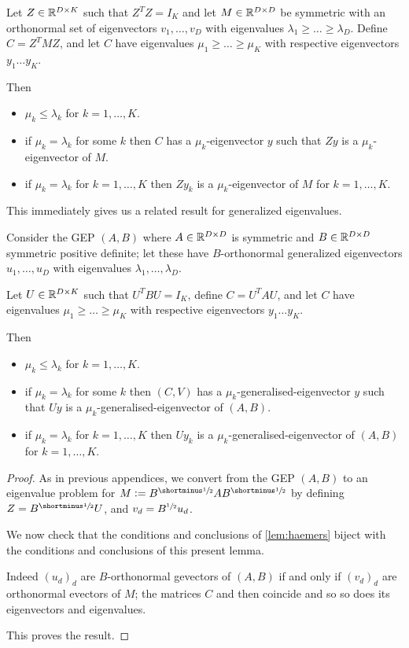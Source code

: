 \begin{lemma}\label{lem:haemers}
Let $Z \in \mathbb{R}^{D\times K}$ such that $Z^T Z = I_K$ and let $M \in \mathbb{R}^{D\times D}$ be symmetric with an orthonormal set of eigenvectors $v_1,\dots, v_D$ with eigenvalues $\lambda_1 \geq \dots \geq \lambda_D$.
Define $C = Z^T M Z$, and let $C$ have eigenvalues $\mu_1 \geq \dots \geq \mu_K$ with respective eigenvectors $y_1 \dots y_K$.

Then
\begin{itemize}
    \item $\mu_k \leq \lambda_k$ for $k=1,\dots,K$.
    \item if $\mu_k = \lambda_k$ for some $k$ then $C$ has a $\mu_k$-eigenvector $y$ such that $Zy$ is a $\mu_k$-eigenvector of $M$.
    \item if $\mu_k = \lambda_k$ for $k=1,\dots,K$ then $Zy_k$ is a $\mu_k$-eigenvector of $M$ for $k=1,\dots,K$.
\end{itemize}
\end{lemma}

This immediately gives us a related result for generalized eigenvalues.

\begin{corollary}\label{cor:generalised-eigenvalue-interlacing}
Consider the GEP $(A, B)$ where $A \in \mathbb{R}^{D \times D}$ is symmetric and $B \in \mathbb{R}^{D \times D}$ symmetric positive definite; let these have $B$-orthonormal generalized eigenvectors $u_1, \dots, u_D$ with eigenvalues $\lambda_1, \dots, \lambda_D$.

Let $U \in \mathbb{R}^{D \times K}$ such that $U^T B U = I_K$, define $C = U^T A U$, and let $C$ have eigenvalues $\mu_1 \geq \dots \geq \mu_K$ with respective eigenvectors $y_1 \dots y_K$.

Then
\begin{itemize}
    \item $\mu_k \leq \lambda_k$ for $k=1,\dots,K$.
    \item if $\mu_k = \lambda_k$ for some $k$ then $(C,V)$ has a $\mu_k$-generalised-eigenvector $y$ such that $Uy$ is a $\mu_k$-generalised-eigenvector of $(A,B)$.
    \item if $\mu_k = \lambda_k$ for $k=1,\dots,K$ then $Uy_k$ is a $\mu_k$-generalised-eigenvector of $(A,B)$ for $k=1,\dots,K$.
\end{itemize}
\end{corollary}
\begin{proof}
    As in previous appendices, we convert from the GEP $(A,B)$ to an eigenvalue problem for $M \defeq B^\mhalf A B^\mhalf$ by defining $Z = B^\mhalf U$, and $v_d = B^{\sfrac{1}{2}} u_d$.

    We now check that the conditions and conclusions of \cref{lem:haemers} biject with the conditions and conclusions of this present lemma.

    Indeed $(u_d)_d$ are $B$-orthonormal gevectors of $(A,B)$ if and only if $(v_d)_d$ are orthonormal evectors of $M$; the matrices $C$ and then coincide and so so does its eigenvectors and eigenvalues.

    This proves the result.
\end{proof}


